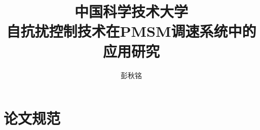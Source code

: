 \documentclass[master,pdf]{ustcthesis}
\title{中国科学技术大学\\自抗扰控制技术在PMSM调速系统中的应用研究}
\author{彭秋铭}
\begin{document}
\maketitle

%

\frontmatter

\tableofcontents
% 

\mainmatter












\appendix
\chapter{论文规范}

\backmatter


\end{document}

